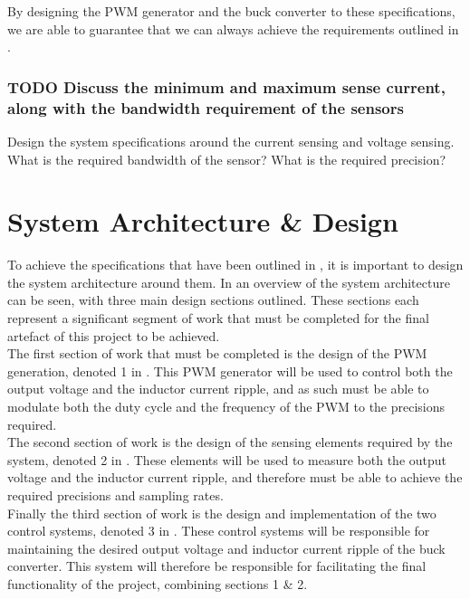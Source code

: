 By designing the PWM generator and the buck converter to these specifications, we are able to guarantee that we can always achieve the requirements outlined in .\\

\subsubsection{TODO Discuss the minimum and maximum sense current, along with the bandwidth requirement of the sensors}
Design the system specifications around the current sensing and voltage sensing. What is the required bandwidth of the sensor? What is the required precision?\\


%
%

\section{System Architecture \& Design}\label{S:system_design}

To achieve the specifications that have been outlined in , it is important to design the system architecture around them. In  an overview of the system architecture can be seen, with three main design sections outlined. These sections each represent a significant segment of work that must be completed for the final artefact of this project to be achieved. \\

The first section of work that must be completed is the design of the PWM generation, denoted 1 in . This PWM generator will be used to control both the output voltage and the inductor current ripple, and as such must be able to modulate both the duty cycle and the frequency of the PWM to the precisions required. \\

The second section of work is the design of the sensing elements required by the system, denoted 2 in . These elements will be used to measure both the output voltage and the inductor current ripple, and therefore must be able to achieve the required precisions and sampling rates. \\

Finally the third section of work is the design and implementation of the two control systems, denoted 3 in . These control systems will be responsible for maintaining the desired output voltage and inductor current ripple of the buck converter. This system will therefore be responsible for facilitating the final functionality of the project, combining sections 1 \& 2. \\


